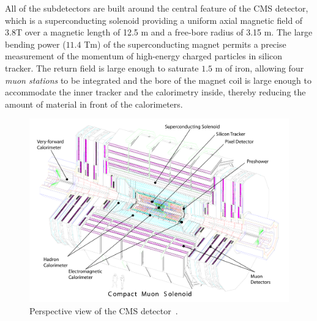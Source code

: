 All of the subdetectors are built around the central feature of the
CMS detector, which is a superconducting solenoid providing a uniform axial
magnetic field of 3.8\unit{T}  over a magnetic length of 12.5 \unit{m}
and a free-bore radius of 3.15 \unit{m}. The large bending power ($11.4$ \unit{T}\unit{m}) of the
superconducting magnet permits a precise measurement of the momentum
of high-energy charged particles in silicon tracker. The return field is large enough to
saturate $1.5$ \unit{m} of iron, allowing four \emph{muon stations} to be
integrated and the bore of the magnet coil is large enough to accommodate the inner tracker
and the calorimetry inside, thereby reducing the amount of material
in front of the calorimeters.


\begin{figure}\centering
\includegraphics[width=.9\textwidth]{figs/cms/Figure_001-002.pdf}
\caption{Perspective view of the CMS detector~\cite{Adolphi:2008zzk}.\label{fig:CMSperspective}}
\end{figure}

